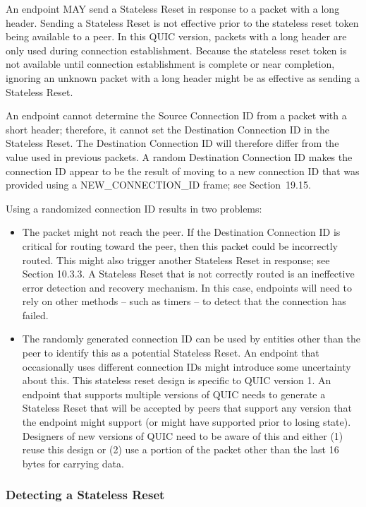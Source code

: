 \documentclass{article}
\begin{document}
An endpoint MAY send a Stateless Reset in response to a packet with a long header.  Sending a Stateless Reset is not effective prior to the stateless reset token being available to a peer.  In this QUIC version, packets with a long header are only used during connection establishment.  Because the stateless reset token is not available until connection establishment is complete or near completion, ignoring an unknown packet with a long header might be as effective as sending a Stateless Reset.

An endpoint cannot determine the Source Connection ID from a packet with a short header; therefore, it cannot set the Destination Connection ID in the Stateless Reset.  The Destination Connection ID will therefore differ from the value used in previous packets.  A random Destination Connection ID makes the connection ID appear to be the result of moving to a new connection ID that was provided using a NEW\_CONNECTION\_ID frame; see Section~19.15.

Using a randomized connection ID results in two problems:

\begin{itemize}
\item The packet might not reach the peer.  If the Destination Connection ID is critical for routing toward the peer, then this packet could be incorrectly routed.  This might also trigger another Stateless Reset in response; see Section 10.3.3.  A Stateless Reset that is not correctly routed is an ineffective error detection and recovery mechanism.  In this case, endpoints will need to rely on other methods -- such as timers -- to detect that the connection has failed.
\item The randomly generated connection ID can be used by entities other than the peer to identify this as a potential Stateless Reset.  An endpoint that occasionally uses different connection IDs might introduce some uncertainty about this.
This stateless reset design is specific to QUIC version 1.  An endpoint that supports multiple versions of QUIC needs to generate a Stateless Reset that will be accepted by peers that support any version that the endpoint might support (or might have supported prior to losing state).  Designers of new versions of QUIC need to be aware of this and either (1) reuse this design or (2) use a portion of the packet other than the last 16 bytes for carrying data.

\end{itemize}
\subsubsection{Detecting a Stateless Reset}
\end{document}
